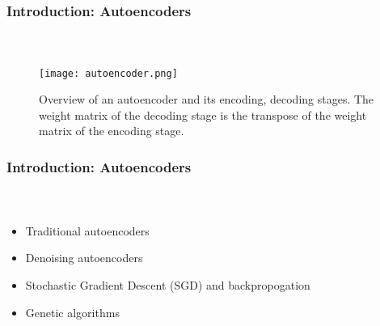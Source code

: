 
\begin{frame}[t]
	\frametitle{Introduction: Autoencoders}
	\framesubtitle{~~}  %

\begin{figure}[h]
	\centering
	\texttt{[image: autoencoder.png]}
	\caption{Overview of an autoencoder and its encoding, decoding stages. The weight matrix of the decoding stage is the transpose of the weight matrix of the encoding stage.}
	\label{fig:autoencoder}
\end{figure}


\end{frame}


\begin{frame}[t]
	\frametitle{Introduction: Autoencoders}
	\framesubtitle{~~}  %
	\begin{itemize}
		\item Traditional autoencoders
		\item Denoising autoencoders
		\item Stochastic Gradient Descent (SGD) and backpropogation
		\item Genetic algorithms
	\end{itemize}


\end{frame}

